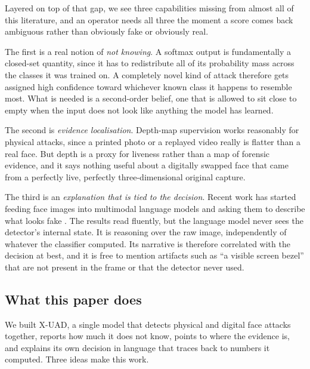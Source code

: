 \documentclass[conference]{IEEEtran}
\begin{document}
Layered on top of that gap, we see three capabilities missing from almost all of
this literature, and an operator needs all three the moment a
score comes back ambiguous rather than obviously fake or obviously real.

The first is a real notion of \emph{not knowing}. A softmax output is fundamentally
a closed-set quantity, since it has to redistribute all of its probability mass
across the classes it was trained on. A completely novel kind of attack therefore
gets assigned high confidence toward whichever known class it happens to resemble
most. What is needed is a second-order belief, one that is allowed to sit
close to empty when the input does not look like anything the model has learned.

The second is \emph{evidence localisation}. Depth-map supervision
\cite{liu2018auxiliary,yu2021revisiting} works reasonably for physical attacks,
since a printed photo or a replayed video really is flatter than a real face. But
depth is a proxy for liveness rather than a map of forensic evidence, and it says
nothing useful about a digitally swapped face that came from a perfectly live,
perfectly three-dimensional original capture.

The third is an \emph{explanation that is tied to the decision}. Recent
work has started feeding face images into multimodal language models and asking
them to describe what looks fake \cite{huang2024ffaa,guo2025m2f2det}. The results
read fluently, but the language model never sees the detector's internal state. It
is reasoning over the raw image, independently of whatever the classifier
computed. Its narrative is therefore correlated with the decision at best, and it
is free to mention artifacts such as ``a visible screen bezel'' that are not
present in the frame or that the detector never used.

\subsection{What this paper does}
We built X-UAD, a single model that detects physical and digital face attacks
together, reports how much it does not know, points to where the evidence is, and
explains its own decision in language that traces back to numbers it
computed. Three ideas make this work.
\end{document}
